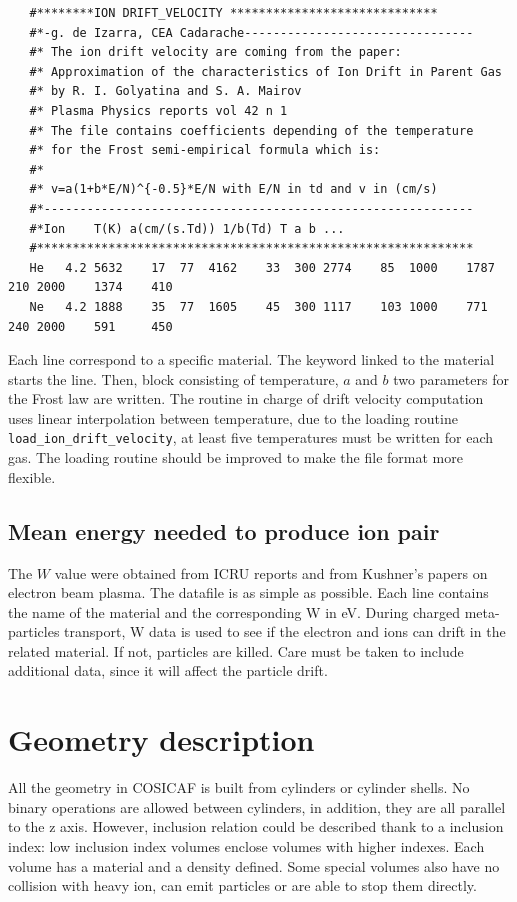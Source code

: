 \documentclass[10pt]{article}
\begin{document}
   \begin{lstlisting}
   #********ION DRIFT_VELOCITY *****************************
   #*-g. de Izarra, CEA Cadarache-------------------------------- 
   #* The ion drift velocity are coming from the paper: 
   #* Approximation of the characteristics of Ion Drift in Parent Gas
   #* by R. I. Golyatina and S. A. Mairov
   #* Plasma Physics reports vol 42 n 1
   #* The file contains coefficients depending of the temperature
   #* for the Frost semi-empirical formula which is:
   #*
   #* v=a(1+b*E/N)^{-0.5}*E/N with E/N in td and v in (cm/s)
   #*------------------------------------------------------------
   #*Ion	T(K) a(cm/(s.Td)) 1/b(Td) T a b ...  
   #*************************************************************
   He	4.2	5632	17	77	4162	33	300	2774	85	1000	1787	210	2000	1374	410
   Ne	4.2	1888	35	77	1605	45	300	1117	103	1000	771		240	2000	591		450
   \end{lstlisting}
   Each line correspond to a specific material. The keyword linked to the material starts the line. Then, block consisting of temperature, $a$ and $b$ two parameters for the Frost law are written. 
   The routine in charge of drift velocity computation uses linear interpolation between temperature, due to the loading routine \lstinline{load_ion_drift_velocity}, at least five temperatures must be written for each gas. The loading routine should be improved to make the file format more flexible.
   
   
   \subsection{Mean energy needed to produce ion pair}
   
   The $W$ value were obtained from ICRU reports and from Kushner's papers on electron beam plasma. The datafile is as simple as possible. Each line contains the name of the material and the corresponding W in eV.
   During charged meta-particles transport, W data is used to see if the electron and ions can drift in the related material. If not, particles are killed. Care must be taken to include additional data, since it will affect the particle drift. 
   
   
	\section{Geometry description}
	
	All the geometry in COSICAF is built from cylinders or cylinder shells.
	No binary operations are allowed between cylinders, in addition, they are all parallel to the z axis. However, inclusion relation could be described thank to a inclusion index: low inclusion index volumes enclose volumes with higher indexes. Each volume has a material and a density defined. Some special volumes also have no collision with heavy ion, can emit particles or are able to stop them directly.
	
\end{document}
